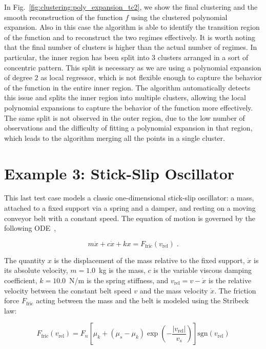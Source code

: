 In Fig.~\ref{fig:clustering:poly_expansion_tc2}, we show the final clustering and the smooth reconstruction of the function $f$ using the clustered polynomial expansion. Also in this case the algorithm is able to identify the transition region of the function and to reconstruct the two regimes effectively. It is worth noting that the final number of clusters is higher than the actual number of regimes. In particular, the inner region has been split into 3 clusters arranged in a sort of concentric pattern. This split is necessary as we are using a polynomial expansion of degree $2$ as local regressor, which is not flexible enough to capture the behavior of the function in the entire inner region. The algorithm automatically detects this issue and splits the inner region into multiple clusters, allowing the local polynomial expansions to capture the behavior of the function more effectively. The same split is not observed in the outer region, due to the low number of observations and the difficulty of fitting a polynomial expansion in that region, which leads to the algorithm merging all the points in a single cluster.

\section{Example 3: Stick-Slip Oscillator}
\label{sc:tc3}

This last test case models a classic one-dimensional stick-slip oscillator: a mass, attached to a fixed support via a spring and a damper, and resting on a moving conveyor belt with a constant speed. The equation of motion is governed by the following ODE~\cite{stickslip},

\begin{equation}
    m \ddot{x} + c \dot{x} + k x = F_{\text{fric}}(v_{\text{rel}})\;.
\end{equation}

The quantity $x$ is the displacement of the mass relative to the fixed support, $\dot{x}$ is its absolute velocity, $m = 1.0$~kg is the mass, $c$ is the variable viscous damping coefficient, $k = 10.0$~N/m is the spring stiffness, and $v_{\text{rel}} = v - \dot{x}$ is the relative velocity between the constant belt speed $v$ and the mass velocity $\dot{x}$. The friction force $F_{\text{fric}}$ acting between the mass and the belt is modeled using the Stribeck law:

\begin{equation}
    F_{\text{fric}}(v_{\text{rel}}) = F_n \left[ \mu_k + (\mu_s - \mu_k) \exp\left(-\frac{|v_{\text{rel}}|}{v_s}\right) \right] \text{sgn}(v_{\text{rel}})
\end{equation}


